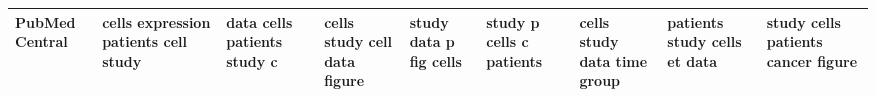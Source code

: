 \documentclass[11pt,a4paper]{article}
\begin{document}
\begin{appendices}
\begin{table}[htb]
\begin{tiny}
\begin{tabular}{|p{}|p{}|p{}|p{}|p{}|p{}|p{}|p{}|p{}|}
    PubMed Central & cells \newline expression \newline patients \newline cell \newline study & data \newline cells \newline patients \newline study \newline c & cells \newline study \newline cell \newline data \newline figure & study \newline data \newline p \newline fig \newline cells & study \newline p \newline cells \newline c \newline patients & cells \newline study \newline data \newline time \newline group & patients \newline study \newline cells \newline et \newline data & study \newline cells \newline patients \newline cancer \newline figure\\\hline

\end{tabular}
\end{tiny}
\end{table}
\end{appendices}
\end{document}
